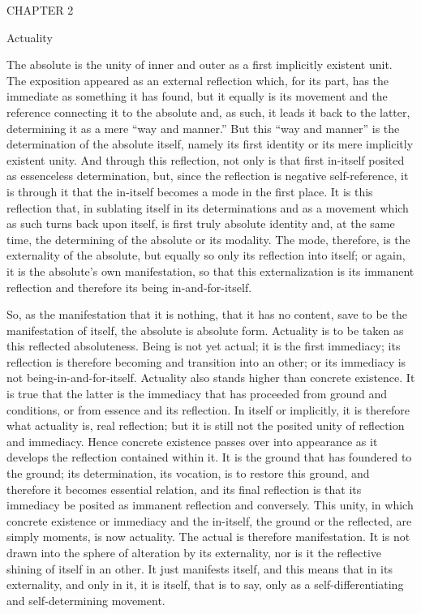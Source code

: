 CHAPTER 2

Actuality

The absolute is the unity of inner and outer
as a first implicitly existent unit.
The exposition appeared as an external reflection
which, for its part, has the immediate as something it has found,
but it equally is its movement and
the reference connecting it to the absolute
and, as such, it leads it back to the latter,
determining it as a mere “way and manner.”
But this “way and manner” is the determination of the absolute itself,
namely its first identity or its mere implicitly existent unity.
And through this reflection, not only is that
first in-itself posited as essenceless determination,
but, since the reflection is negative self-reference,
it is through it that the in-itself becomes
a mode in the first place.
It is this reflection that,
in sublating itself in its determinations
and as a movement which as such turns back upon itself,
is first truly absolute identity
and, at the same time, the determining of
the absolute or its modality.
The mode, therefore, is the externality of the absolute,
but equally so only its reflection into itself;
or again, it is the absolute's own manifestation,
so that this externalization is its immanent reflection
and therefore its being in-and-for-itself.

So, as the manifestation that it is nothing,
that it has no content, save to be the manifestation of itself,
the absolute is absolute form.
Actuality is to be taken as this reflected absoluteness.
Being is not yet actual;
it is the first immediacy;
its reflection is therefore becoming
and transition into an other;
or its immediacy is not being-in-and-for-itself.
Actuality also stands higher than concrete existence.
It is true that the latter is the immediacy
that has proceeded from ground and conditions,
or from essence and its reflection.
In itself or implicitly, it is therefore
what actuality is, real reflection;
but it is still not the posited unity of reflection and immediacy.
Hence concrete existence passes over into appearance
as it develops the reflection contained within it.
It is the ground that has foundered to the ground;
its determination, its vocation, is to restore this ground,
and therefore it becomes essential relation,
and its final reflection is that its
immediacy be posited as immanent reflection and conversely.
This unity, in which concrete existence
or immediacy and the in-itself,
the ground or the reflected, are simply moments,
is now actuality.
The actual is therefore manifestation.
It is not drawn into the sphere of alteration by its externality,
nor is it the reflective shining of itself in an other.
It just manifests itself, and this means that in its externality,
and only in it, it is itself, that is to say,
only as a self-differentiating and self-determining movement.

